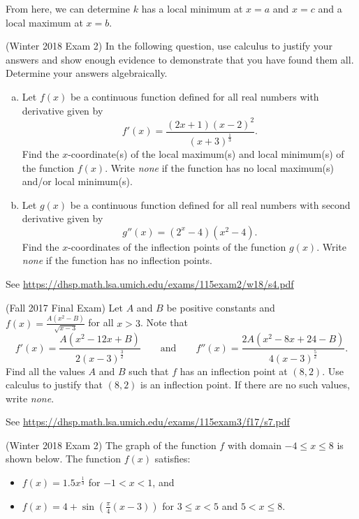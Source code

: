 \documentclass[11pt]{exam}
\begin{document}
\begin{questions}
\begin{solution}
From here, we can determine \(k\) has a local minimum at \(x=a\) and
\(x=c\) and a local maximum at \(x=b\).
  \end{solution}
\question (Winter 2018 Exam 2) %
In the following question, use calculus to justify your answers and show enough evidence to
demonstrate that you have found them all. Determine your answers algebraically.
\begin{enumerate}[(a)]
\item Let $f(x)$ be a continuous function defined for all real numbers with derivative given by
$$f'(x)=\frac{(2x+1)(x-2)^2}{(x+3)^{\frac{1}{3}}}.$$
Find the $x$-coordinate(s) of the local maximum(s) and local minimum(s) of the function $f(x)$. Write \emph{none} if the function has no local maximum(s) and/or local minimum(s).
\item Let $g(x)$ be a continuous function defined for all real numbers with second derivative given by
$$g''(x)=(2^x-4)(x^2-4).$$
Find the $x$-coordinates of the inflection points of the function $g(x)$. Write \emph{none} if the function has no inflection points.
\end{enumerate}
\begin{solution}
  See \href{https://dhsp.math.lsa.umich.edu/exams/115exam2/w18/s4.pdf}{https://dhsp.math.lsa.umich.edu/exams/115exam2/w18/s4.pdf}
\end{solution}
\question (Fall 2017 Final Exam) %
	Let $A$ and $B$ be positive constants and $f(x) = \frac{A(x^2-B)}{\sqrt{x-3}}$ for all $x>3$. Note that
	$$f'(x)=\frac{A(x^2-12x+B)}{2(x-3)^{\frac{3}{2}}} \qquad \textrm{and} \qquad f''(x)=\frac{2A(x^2-8x+24-B)}{4(x-3)^{\frac{5}{2}}}.$$
	Find all the values $A$ and $B$ such that $f$ has an inflection point at $(8,2)$. Use calculus to justify that $(8,2)$ is an inflection point. If there are no such values, write \emph{none}.
        \begin{solution}
          See \href{https://dhsp.math.lsa.umich.edu/exams/115exam3/f17/s7.pdf}{https://dhsp.math.lsa.umich.edu/exams/115exam3/f17/s7.pdf}
        \end{solution}
      \question (Winter 2018 Exam 2) %
        The graph of the function $f$ with domain $-4 \leqslant x \leqslant 8$ is shown below. The function $f(x)$ satisfies:
\begin{itemize}
\item $f(x) = 1.5 x^{\frac{1}{3}}$ for $-1<x<1$, and
\item $f(x) = 4 +\displaystyle\sin \left( \frac{\pi}{4} (x-3) \right)$ for $3 \leqslant x < 5$ and $5 < x \leqslant 8$.

\end{itemize}
\end{questions}
\end{document}
